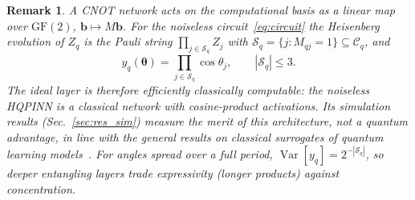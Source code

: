 \documentclass[floatfix,aps,pra,twocolumn,superscriptaddress,10pt,nofootinbib]{revtex4-2}
\newtheorem{remark}{Remark}
\begin{document}
\begin{remark}\label{rem:parity}
A CNOT network acts on the computational basis as a linear map over $\mathrm{GF}(2)$, $\bm b\mapsto M\bm b$. For the noiseless circuit~\eqref{eq:circuit} the Heisenberg evolution of $Z_q$ is the Pauli string $\prod_{j\in\mathcal S_q}Z_j$ with $\mathcal S_q=\{j:M_{qj}=1\}\subseteq\mathcal C_q$, and
\begin{equation}
  y_q(\bm\theta)=\prod_{j\in\mathcal S_q}\cos\theta_j ,\qquad |\mathcal S_q|\le3 .
  \label{eq:parity}
\end{equation}
The ideal layer is therefore efficiently classically computable: the noiseless HQPINN is a classical network with cosine-product activations. Its simulation results (Sec.~\ref{sec:res_sim}) measure the merit of this \emph{architecture}, not a quantum advantage, in line with the general results on classical surrogates of quantum learning models~\cite{schreiber2023classical}. For angles spread over a full period, $\operatorname{Var}[y_q]=2^{-|\mathcal S_q|}$, so deeper entangling layers trade expressivity (longer products) against concentration.
\end{remark}
\end{document}
